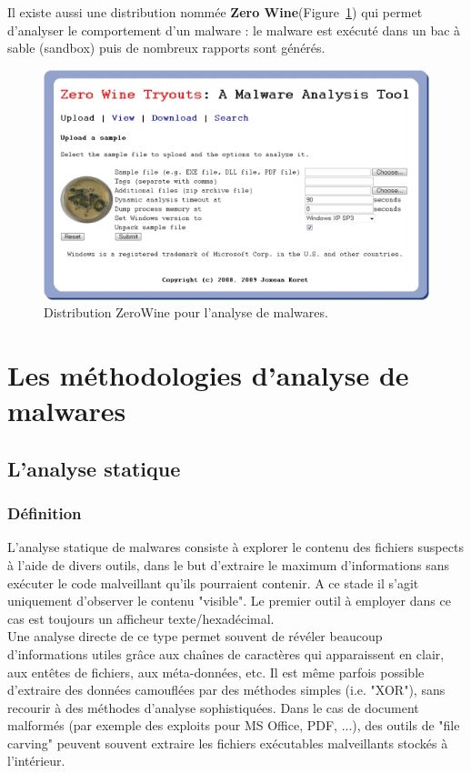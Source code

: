 Il existe aussi une distribution nommée \textbf{Zero Wine}(Figure~\ref{fig :wine}) qui permet d'analyser le comportement d'un malware : le malware est exécuté dans un bac à sable (sandbox) puis de nombreux rapports sont générés.
\begin{figure}[H]
\begin{center}
\includegraphics[scale=0.7]{Figures/wine.jpg}
\caption{Distribution ZeroWine pour l'analyse de malwares.}
\label{fig :wine} 
\end{center}
\end{figure}
\section{Les méthodologies d'analyse de malwares}
\subsection{L'analyse statique}
\subsubsection{Définition}
L'analyse statique de malwares consiste à explorer le contenu des fichiers suspects à l'aide de divers outils, dans le but d'extraire le maximum d'informations sans exécuter le code malveillant qu'ils pourraient contenir. A ce stade il s'agit uniquement
d'observer le contenu "visible". Le premier outil à employer dans ce cas est
toujours un afficheur texte/hexadécimal.\\

Une analyse directe de ce type permet souvent de révéler beaucoup d'informations utiles grâce aux chaînes de caractères qui apparaissent en clair, aux entêtes de fichiers, aux méta-données, etc. Il est même parfois possible d'extraire des données camouflées par des méthodes simples (i.e. "XOR"), sans recourir à des méthodes d'analyse sophistiquées. Dans le cas de document malformés (par exemple des exploits pour MS Office, PDF, ...), des outils de "file carving" peuvent souvent extraire les fichiers exécutables malveillants stockés à l'intérieur.\\

